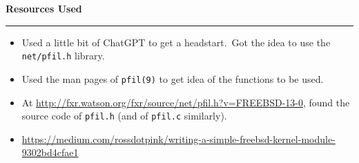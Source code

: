 \documentclass[a4paper,12pt]{article}
\newenvironment{solution}[2][]{%
\begin{mdframed}[linecolor=blue!70!black, linewidth=2pt, roundcorner=10pt, backgroundcolor=yellow!10!white, skipabove=12pt, skipbelow=12pt]%
	\textbf{\large #2}
	\par\noindent\rule{\textwidth}{0.4pt}
}{
\end{mdframed}
}
\begin{document}
\begin{solution}{Resources Used}
    \begin{itemize}
        \item Used a little bit of ChatGPT to get a headstart.\ Got the idea to use the \texttt{net/pfil.h} library.
        \item Used the man pages of \texttt{pfil(9)} to get idea of the functions to be used.
        \item At \url{http://fxr.watson.org/fxr/source/net/pfil.h?v=FREEBSD-13-0}, found the source code of \texttt{pfil.h} (and of \texttt{pfil.c} similarly).
        \item {\small \url{https://medium.com/rossdotpink/writing-a-simple-freebsd-kernel-module-9302bd4cfae1}}
    \end{itemize}
\end{solution}
\end{document}
